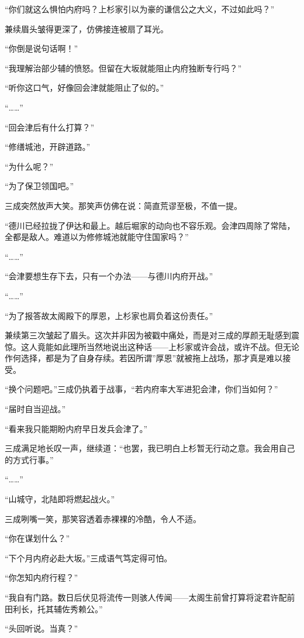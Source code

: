 \documentclass[
]{book}
\begin{document}
``你们就这么惧怕内府吗？上杉家引以为豪的谦信公之大义，不过如此吗？''

兼续眉头皱得更深了，仿佛接连被扇了耳光。

``你倒是说句话啊！''

``我理解治部少辅的愤怒。但留在大坂就能阻止内府独断专行吗？''

``听你这口气，好像回会津就能阻止了似的。''

``\ldots\ldots{}''

``回会津后有什么打算？''

``修缮城池，开辟道路。''

``为什么呢？''

``为了保卫领国吧。''

三成突然放声大笑。那笑声仿佛在说：简直荒谬至极，不值一提。

``德川已经拉拢了伊达和最上。越后堀家的动向也不容乐观。会津四周除了常陆，全都是敌人。难道以为修修城池就能守住国家吗？''

``\ldots\ldots{}''

``会津要想生存下去，只有一个办法------与德川内府开战。''

``\ldots\ldots{}''

``为了报答故太阁殿下的厚恩，上杉家也肩负着这份责任。''

兼续第三次皱起了眉头。这次并非因为被戳中痛处，而是对三成的厚颜无耻感到震惊。这人竟能如此理所当然地说出这种话------上杉家或许会战，或许不战。但无论作何选择，都是为了自身存续。若因所谓''厚恩''就被拖上战场，那才真是难以接受。

``换个问题吧。''三成仍执着于战事，``若内府率大军进犯会津，你们当如何？''

``届时自当迎战。''

``看来我只能期盼内府早日发兵会津了。''

三成满足地长叹一声，继续道：``也罢，我已明白上杉暂无行动之意。我会用自己的方式行事。''

``\ldots\ldots{}''

``山城守，北陆即将燃起战火。''

三成咧嘴一笑，那笑容透着赤裸裸的冷酷，令人不适。

``你在谋划什么？''

``下个月内府必赴大坂。''三成语气笃定得可怕。

``你怎知内府行程？''

``我自有门路。数日后伏见将流传一则骇人传闻------太阁生前曾打算将淀君许配前田利长，托其辅佐秀赖公。''

``头回听说。当真？''
\end{document}
